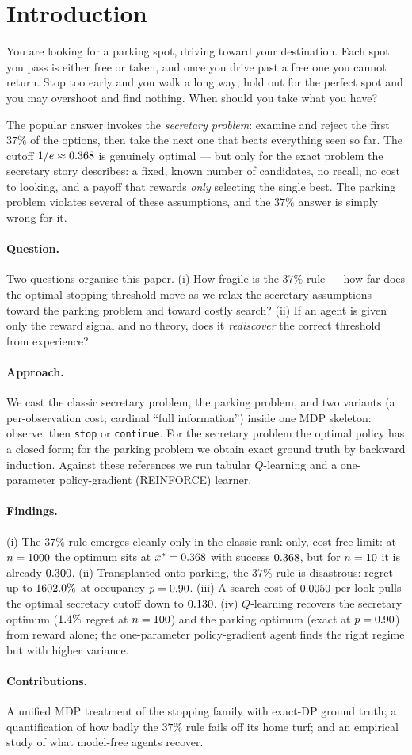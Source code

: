 \section{Introduction}
You are looking for a parking spot, driving toward your destination. Each spot
you pass is either free or taken, and once you drive past a free one you cannot
return. Stop too early and you walk a long way; hold out for the perfect spot
and you may overshoot and find nothing. When should you take what you have?

The popular answer invokes the \emph{secretary problem}: examine and reject the
first $37\%$ of the options, then take the next one that beats everything seen
so far. The cutoff $1/e\approx0.368$ is genuinely optimal --- but only for
the exact problem the secretary story describes: a fixed, known number of
candidates, no recall, no cost to looking, and a payoff that rewards \emph{only}
selecting the single best. The parking problem violates several of these
assumptions, and the $37\%$ answer is simply wrong for it.

\paragraph{Question.} Two questions organise this paper. (i) How fragile is the
$37\%$ rule --- how far does the optimal stopping threshold move as we relax the
secretary assumptions toward the parking problem and toward costly search?
(ii) If an agent is given only the reward signal and no theory, does it
\emph{rediscover} the correct threshold from experience?

\paragraph{Approach.} We cast the classic secretary problem, the parking
problem, and two variants (a per-observation cost; cardinal ``full
information'') inside one MDP skeleton: observe, then \texttt{stop} or
\texttt{continue}. For the secretary problem the optimal policy has a
closed form; for the parking problem we obtain exact ground truth by backward
induction. Against these references we run tabular $Q$-learning and a
one-parameter policy-gradient (REINFORCE) learner.

\paragraph{Findings.} (i) The $37\%$ rule emerges cleanly only in the classic
rank-only, cost-free limit: at $n=1000$ the optimum sits at
$x^*=0.368$ with success $0.368$, but for $n=10$ it is already
$0.300$. (ii) Transplanted onto parking, the $37\%$ rule is disastrous:
regret up to $1602.0\%$ at occupancy $p=0.90$. (iii) A search
cost of $0.0050$ per look pulls the optimal secretary cutoff down to
$0.130$. (iv) $Q$-learning recovers the secretary optimum
($1.4\%$ regret at $n=100$) and the parking optimum (exact at
$p=0.90$) from reward alone; the one-parameter policy-gradient agent finds
the right regime but with higher variance.

\paragraph{Contributions.} A unified MDP treatment of the stopping family with
exact-DP ground truth; a quantification of how badly the $37\%$ rule fails off
its home turf; and an empirical study of what model-free agents recover.
